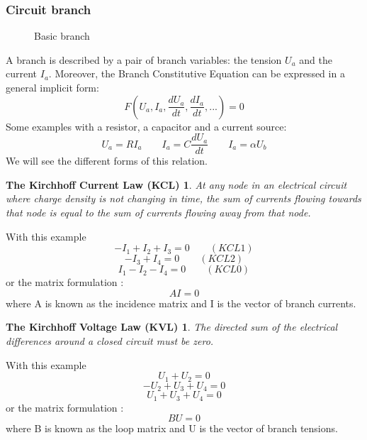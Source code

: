 \frame
{
  \frametitle{Circuit branch}
\begin{figure}[h]
\centerline{
 \scalebox{0.4}{
    
 }
}
\caption{Basic branch}
\end{figure}
A branch is described by a pair of branch variables: the tension $U_{a}$ and the current $I_{a}$.
Moreover, the Branch Constitutive Equation can be expressed in a general implicit form:
\begin{equation}\label{BCE}F(U_{a},I_{a},\frac{dU_{a}}{dt},\frac{dI_{a}}{dt},...)=0\end{equation}
Some examples with a resistor, a capacitor and a current source:
\[U_{a}=RI_{a} \qquad I_{a}=C\frac{dU_{a}}{dt} \qquad I_{a}=\alpha U_{b}\]
We will see the different forms of this relation.
  }

\frame
{
\newtheorem{kcl}{The Kirchhoff Current Law (KCL)}
\begin{kcl}
At any node in an electrical circuit where charge density is not changing in time, the sum of
currents flowing towards that node is equal to the sum of currents flowing away from that node.
\end{kcl}
\begin{figure}[h]
\centerline{
 \scalebox{0.35}{
    
 }
}
\end{figure}
With this example 
\[-I_{1}+I_{2}+I_{3}=0 \qquad (KCL1)\]
\[-I_{3}+I_{4}=0 \qquad (KCL2)\]
\[I_{1}-I_{2}-I_{4}=0 \qquad (KCL0)\]
or the matrix formulation :
\[AI=0\]
where A is known as the incidence matrix and I is the vector of branch currents.

}
\frame
{
\newtheorem{kvl}{The Kirchhoff Voltage Law (KVL)}
\begin{kvl}
The directed sum of the electrical differences around a closed circuit must be zero.
\end{kvl}
\begin{figure}[h]
\centerline{
 \scalebox{0.35}{
    
 }
}
\end{figure}
With this example 
\[U_{1}+U_{2}=0\]
\[ -U_{2}+U_{3}+U_{4}=0\]
\[ U_{1}+U_{3}+U_{4}=0\]
or the matrix formulation :
\[BU=0\]
where B is known as the loop matrix and U is the vector of branch tensions.
}

